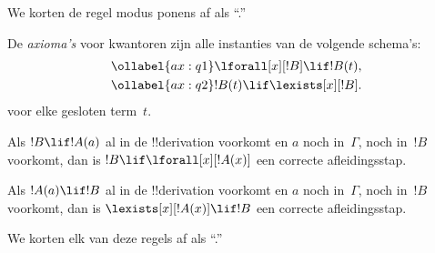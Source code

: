 \documentclass[openany]{memoir}
\begin{document}
We korten de regel modus ponens af als ``\MP.''
\endgroup

\begingroup
\def\olfilename{OLP-0115}
\def\olfilepath{content/first-order-logic/axiomatic-deduction/}
\hypertarget{unit-OLP-0115}{}





\begin{defn}
De \emph{axioma's} voor kwantoren zijn alle instanties van de volgende
schema's:
\begin{align}
\ollabel{ax:q1} & \lforall[x][!B] \lif !B(t), \\
\ollabel{ax:q2} & !B(t) \lif \lexists[x][!B].
\end{align}
voor elke gesloten term~$t$.
\end{defn}

\begin{defn}
\item Als $!B \lif !A(a)$ al in de !!{derivation} voorkomt en $a$
  noch in~$\Gamma$, noch in~$!B$ voorkomt, dan is $!B \lif
  \lforall[x][!A(x)]$ een correcte afleidingsstap.
\item Als $!A(a) \lif !B$ al in de !!{derivation} voorkomt en $a$
  noch in~$\Gamma$, noch in~$!B$ voorkomt, dan is
  $\lexists[x][!A(x)] \lif !B$ een correcte afleidingsstap.
\end{defn}

We korten elk van deze regels af als ``\QR.''
\endgroup

\begingroup
\def\olfilename{OLP-0116}
\def\olfilepath{content/first-order-logic/axiomatic-deduction/}
\hypertarget{unit-OLP-0116}{}
\end{document}
